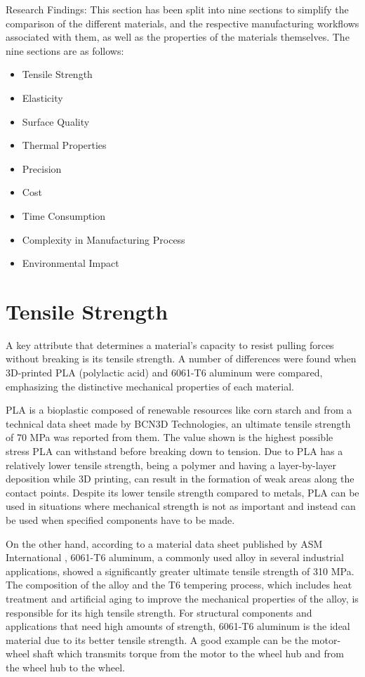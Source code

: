 Research Findings:
This section has been split into nine sections to simplify the comparison of the different materials, and the respective manufacturing workflows associated with them, as well as the properties of the materials themselves. The nine sections are as follows:

\begin{itemize}[itemsep=2mm]
    \item Tensile Strength
    \item Elasticity
    \item Surface Quality
    \item Thermal Properties
    \item Precision
    \item Cost
    \item Time Consumption
    \item Complexity in Manufacturing Process
    \item Environmental Impact
\end{itemize}


\section{Tensile Strength}

    A key attribute that determines a material's capacity to resist pulling forces without breaking is its
    tensile strength. A number of differences were found when 3D-printed PLA (polylactic acid) and 6061-T6 aluminum were compared, emphasizing the distinctive mechanical properties of each material.

    PLA is a bioplastic composed of renewable resources like corn starch and from a technical data sheet
    made by BCN3D Technologies, an ultimate tensile strength of 70 MPa was reported from them.\cite{pla_spec_ultimaker} 
    The value shown is the highest possible stress PLA can withstand before breaking down to tension. Due to
    PLA has a relatively lower tensile strength, being a polymer and having a layer-by-layer deposition while 3D printing, can result in the formation of weak areas along the contact points. Despite its lower
    tensile strength compared to metals, PLA can be used in situations where mechanical strength is not as important and instead can be used when specified components have to be made.
    

    On the other hand, according to a material data sheet published by ASM International \cite{aluminum_spec}
    , 6061-T6 aluminum, a commonly used alloy in several industrial applications, showed a significantly greater
    ultimate tensile strength of 310 MPa. The composition of the alloy and the T6 tempering process, which
    includes heat treatment and artificial aging to improve the mechanical properties of the alloy, is responsible for its high tensile strength. For structural components and applications that need high
    amounts of strength, 6061-T6 aluminum is the ideal material due to its better tensile strength. A good
    example can be the motor-wheel shaft which transmits torque from the motor to the wheel hub and from
    the wheel hub to the wheel.

